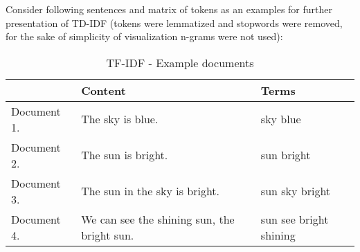 Consider following sentences and matrix of tokens as an examples for further presentation of TD-IDF (tokens were lemmatized and stopwords were removed, for the sake of simplicity of visualization n-grams were not used):

\begin{table}[H]
	\centering
	\caption{TF-IDF - Example documents}
	\label{tf_idf_example_sentences}
	\begin{tabular}{@{}lll@{}}
		\toprule
		& Content                                     & Terms      \\ \midrule
		Document 1. & The sky is blue.                            & sky blue               \\
		Document 2. & The sun is bright.                          & sun bright             \\
		Document 3. & The sun in the sky is bright.               & sun sky bright         \\
		Document 4. & We can see the shining sun, the bright sun. & sun see bright shining \\ \bottomrule
	\end{tabular}
\end{table}

